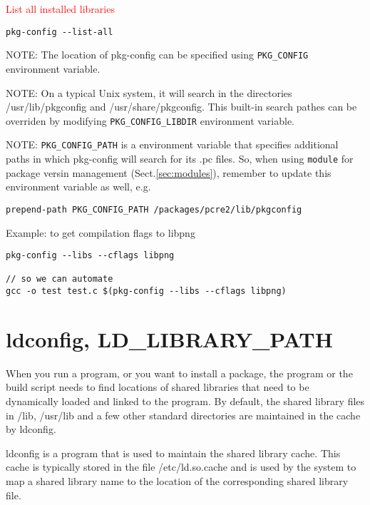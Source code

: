 \textcolor{red}{List all installed libraries}
\begin{verbatim}
pkg-config --list-all
\end{verbatim}

NOTE: The location of pkg-config can be specified using \verb!PKG_CONFIG!
environment variable.

NOTE: On a typical Unix system, it will search in the directories
/usr/lib/pkgconfig and /usr/share/pkgconfig. This built-in search pathes can be
overriden by modifying \verb!PKG_CONFIG_LIBDIR! environment variable.

NOTE: \verb!PKG_CONFIG_PATH! is a environment variable that specifies additional
paths in which pkg-config will search for its .pc files. So, when using
\verb!module! for package versin management (Sect.\ref{sec:modules}), remember
to update this environment variable as well, e.g.
\begin{verbatim}
prepend-path PKG_CONFIG_PATH /packages/pcre2/lib/pkgconfig
\end{verbatim}

Example: to get compilation flags to libpng
\begin{verbatim}
pkg-config --libs --cflags libpng

// so we can automate
gcc -o test test.c $(pkg-config --libs --cflags libpng)
\end{verbatim}


\section{ldconfig, LD\_LIBRARY\_PATH}
\label{sec:ldconfig}
\label{sec:LD_LIBRARY_PATH-env}

When you run a program, or you want to install a package, the program or the
build script needs to find locations of shared libraries that need to be
dynamically loaded and linked to the program. By default, the shared library
files in /lib, /usr/lib and a few other standard directories are maintained in
the cache by ldconfig.

ldconfig is a program that is used to maintain the shared library cache. This
cache is typically stored in the file /etc/ld.so.cache and is used by the system
to map a shared library name to the location of the corresponding shared library
file.  

